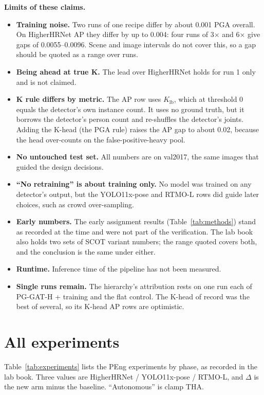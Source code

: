 \documentclass[11pt,a4paper]{article}
\newcommand{\Klb}{K_{\mathrm{lb}}}
\begin{document}
\textbf{Limits of these claims.}
\begin{itemize}
    \item \textbf{Training noise.} Two runs of one recipe differ by about 0.001 PGA overall.
    On HigherHRNet AP they differ by up to 0.004: four runs of 3$\times$ and 6$\times$ give gaps of 0.0055--0.0096.
    Scene and image intervals do not cover this, so a gap should be quoted as a range over runs.
    \item \textbf{Being ahead at true K.} The lead over HigherHRNet holds for run 1 only and is not claimed.
    \item \textbf{K rule differs by metric.} The AP row uses $\Klb$, which at threshold 0 equals the detector's own
    instance count.
    It uses no ground truth, but it borrows the detector's person count and re-shuffles the detector's joints.
    Adding the K-head (the PGA rule) raises the AP gap to about 0.02, because the head over-counts on the
    false-positive-heavy pool.
    \item \textbf{No untouched test set.} All numbers are on val2017, the same images that guided the design decisions.
    \item \textbf{``No retraining'' is about training only.} No model was trained on any detector's output,
    but the YOLO11x-pose and RTMO-L rows did guide later choices, such as crowd over-sampling.
    \item \textbf{Early numbers.} The early assignment results (Table~\ref{tab:methods}) stand as recorded at
    the time and were not part of the verification.
    The lab book also holds two sets of SCOT variant numbers; the range quoted covers both, and the conclusion is the
    same under either.
    \item \textbf{Runtime.} Inference time of the pipeline has not been measured.
    \item \textbf{Single runs remain.} The hierarchy's attribution rests on one run each of PG-GAT-H + training and the
    flat control.
    The K-head of record was the best of several, so its K-head AP rows are optimistic.
\end{itemize}

\section{All experiments}
\label{sec_experiments}

Table~\ref{tab:experiments} lists the PEng experiments by phase, as recorded in the lab book.
Three values are HigherHRNet / YOLO11x-pose / RTMO-L, and $\Delta$ is the new arm minus the baseline.
``Autonomous'' is clamp THA.
\end{document}
